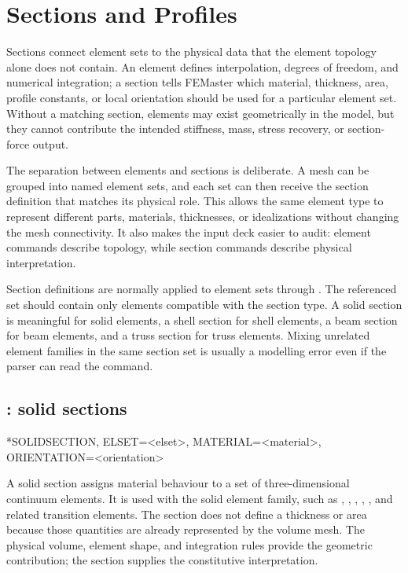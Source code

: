 \chapter{Sections and Profiles}
\label{chap:sections}

Sections connect element sets to the physical data that the element topology alone does not contain. An element defines interpolation, degrees of freedom, and numerical integration; a section tells FEMaster which material, thickness, area, profile constants, or local orientation should be used for a particular element set. Without a matching section, elements may exist geometrically in the model, but they cannot contribute the intended stiffness, mass, stress recovery, or section-force output.

The separation between elements and sections is deliberate. A mesh can be grouped into named element sets, and each set can then receive the section definition that matches its physical role. This allows the same element type to represent different parts, materials, thicknesses, or idealizations without changing the mesh connectivity. It also makes the input deck easier to audit: element commands describe topology, while section commands describe physical interpretation.

Section definitions are normally applied to element sets through . The referenced set should contain only elements compatible with the section type. A solid section is meaningful for solid elements, a shell section for shell elements, a beam section for beam elements, and a truss section for truss elements. Mixing unrelated element families in the same section set is usually a modelling error even if the parser can read the command.

\section{: solid sections}

\begin{syntax}
*SOLIDSECTION, ELSET=<elset>, MATERIAL=<material>, ORIENTATION=<orientation>
\end{syntax}

A solid section assigns material behaviour to a set of three-dimensional continuum elements. It is used with the solid element family, such as , , , , , and related transition elements. The section does not define a thickness or area because those quantities are already represented by the volume mesh. The physical volume, element shape, and integration rules provide the geometric contribution; the section supplies the constitutive interpretation.

